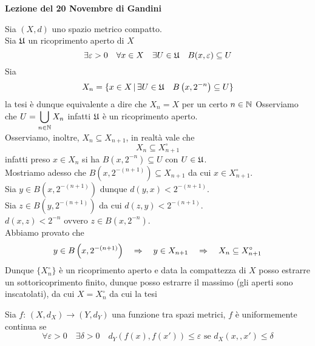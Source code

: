 


\textbf{Lezione del 20 Novembre di Gandini}
\begin{thm}\bianco
Sia $(X,d)$ uno spazio metrico compatto.\\
Sia $\mathfrak{U}$ un ricoprimento aperto di $X$
$$ \exists \varepsilon >0 \quad \forall x \in X \quad \exists U \in \mathfrak{U} \quad B(x,\varepsilon) \subseteq U $$
\proof Sia 
$$ X_n = \{  x \in X \, \vert \, \exists U \in \mathfrak{U} \quad B\left(  x, 2^{-n}\right)\subseteq U \}$$
la tesi \`e dunque equivalente a dire che $X_n =X $ per un certo $n \in \mathbb{N}$
Osserviamo che $U = \displaystyle \bigcup_{n \in \mathbb{N} } X_n$ infatti $\mathfrak{U} $ \`e un ricoprimento aperto.\\
Osserviamo,  inoltre, $X_n \subseteq X_{n+1}$, in realt\`a vale che 
$$ X_n \subseteq X_{n+1}^ \circ $$ 
infatti preso $x\in X_n$ si ha $B\left( x, 2^{-n} \right) \subseteq U $ con $U\in \mathfrak{U} $.\\
Mostriamo adesso che $B \left( x, 2^{-(n+1)}\right) \subseteq X_{n+1}$ da cui $x \in X_{n+1}^\circ$.\\
Sia $y \in B \left( x, 2^{-(n+1)} \right)$ dunque $d(y,x) < {2^{-(n+1)}}$.\\
Sia $z \in B\left( y, 2^{-(n+1)} \right)$ da cui  $d(z,y)< 2^{-(n+1)}$.\\
 $d(x,z)<{2^{-n}}$ ovvero $z\in B \left( x, 2^{-n}\right)$.\\
Abbiamo provato che 
$$ y \in B\left( x , 2^{-(n+1)}\right) \quad \Rightarrow \quad y \in X_{n+1} \quad  \Rightarrow \quad X_n \subseteq X_{n+1}^\circ$$
Dunque $\{ X_n^\circ\}$ \`e un ricoprimento aperto e data la compattezza di $X$ posso estrarre un sottoricoprimento finito, dunque posso estrarre il massimo (gli aperti sono inscatolati), da cui $X=X_n^\circ$ da cui la tesi
\endproof
\end{thm}
\begin{defn}\bianco
Sia $f:\,(X,d_X) \to (Y,d_Y)$ una funzione tra spazi metrici, $f$ \`e uniformemente continua se 
$$ \forall \varepsilon>0 \quad \exists \delta>0 \quad d_Y(f(x),
f(x')) \leq \varepsilon  \text{ se } d_X(x,,x') \leq \delta$$
\end{defn}
